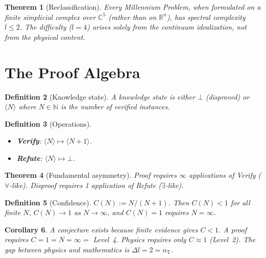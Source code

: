 \documentclass[12pt]{article}
\newtheorem{theorem}{Theorem}[section]
\newtheorem{corollary}[theorem]{Corollary}
\newtheorem{definition}[theorem]{Definition}
\theoremstyle{remark}
\newcommand{\CC}{\mathbb{C}}
\newcommand{\RR}{\mathbb{R}}
\newcommand{\NN}{\mathbb{N}}
\newcommand{\nT}{n_{\mathrm{T}}}
\begin{document}
\begin{theorem}[Reclassification]
Every Millennium Problem, when formulated on a finite
simplicial complex over $\CC^5$ (rather than on $\RR^n$),
has spectral complexity $l \le 2$.
The difficulty ($l = 4$) arises solely from the continuum
idealization, not from the physical content.
\end{theorem}

\section{The Proof Algebra}

\begin{definition}[Knowledge state]
A knowledge state is either $\bot$ (disproved) or
$\langle N \rangle$ where $N \in \NN$ is the number of
verified instances.
\end{definition}

\begin{definition}[Operations]
\begin{itemize}
\item \textbf{Verify}: $\langle N \rangle \mapsto \langle N+1 \rangle$.
\item \textbf{Refute}: $\langle N \rangle \mapsto \bot$.
\end{itemize}
\end{definition}

\begin{theorem}[Fundamental asymmetry]
Proof requires $\infty$ applications of Verify ($\forall$-like).
Disproof requires 1 application of Refute ($\exists$-like).
\end{theorem}

\begin{definition}[Confidence]
$C(N) := N/(N+1)$. Then $C(N) < 1$ for all finite $N$,
$C(N) \to 1$ as $N \to \infty$, and $C(N) = 1$ requires $N = \infty$.
\end{definition}

\begin{corollary}
A conjecture exists because finite evidence gives $C < 1$.
A proof requires $C = 1 = N = \infty = $ Level~4.
Physics requires only $C \approx 1$ (Level~2).
The gap between physics and mathematics is $\Delta l = 2 = \nT$.
\end{corollary}

\end{document}
